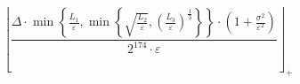 \[\left\lfloor \frac{\Delta \cdot \min\left\{ \frac{L_1}{\varepsilon}, \min\left\{ \sqrt{\frac{L_2}{\varepsilon}}, \left(\frac{L_3}{\varepsilon}\right)^{\frac{1}{3}} \right\} \right\} \cdot \left(1 + \frac{\sigma^{2}}{\varepsilon^{2}}\right)}{2^{174} \cdot \varepsilon} \right\rfloor_{+}\]
